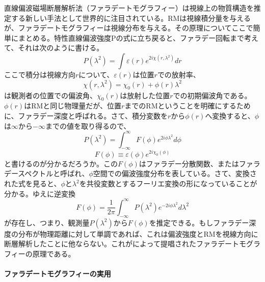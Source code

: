 直線偏波磁場断層解析法（ファラデートモグラフィー）は視線上の物質構造を推定する新しい手法として世界的に注目されている。RMは視線積分量を与えるが、ファラデートモグラフィーは視線分布を与える。その原理についてここで簡単にまとめる。特性直線偏波強度Pの式に立ち戻ると、ファラデー回転まで考えて、それは次のように書ける。
\begin{equation}
P(\lambda^2)=\int \varepsilon(r)e^{2i\chi(r,\lambda^2)}dr
\end{equation}
ここで積分は視線方向$r$について、$\varepsilon(r)$は位置$r$での放射率、
\begin{equation}
\chi(r,\lambda^2)=\chi_0(r)+\phi(r)\lambda^2
\end{equation}
は観測者の位置での偏波角、$\chi_0(r)$は放射した位置$r$での初期偏波角である。$\phi(r)$はRMと同じ物理量だが、位置$r$までのRMということを明確にするために、ファラデー深度と呼ばれる。さて、積分変数を$r$から$\phi(r)$へ変換すると、$\phi$は$\infty$から$-\infty$までの値を取り得るので、
\begin{equation}
P(\lambda^2)=\int^\infty_{-\infty}F(\phi)e^{2i\phi\lambda^2}d\phi
\end{equation}
\begin{equation}
F(\phi) \equiv \varepsilon(\phi)e^{2i\chi_0(\phi)}
\end{equation}
と書けるのが分かるだろうか。この$F(\phi)$はファラデー分散関数、またはファラデースペクトルと呼ばれ、$\phi$空間での偏波強度分布を表している。さて、変換された式を見ると、$\phi$と$\lambda^2$を共役変数とするフーリエ変換の形になっていることが分かる。ゆえに逆変換
\begin{equation}
F(\phi)=\frac{1}{2\pi}\int^\infty_{-\infty}P(\lambda^2)e^{-2i\phi\lambda^2}d\lambda^2
\end{equation}
が存在し、つまり、観測量$P(\lambda^2)$から$F(\phi)$を推定できる。もしファラデー深度の分布が物理距離に対して単調であれば、これは偏波強度とRMを視線方向に断層解析したことに他ならない。これが\citet{1966MNRAS.133...67B}によって提唱されたファラデートモグラフィーの原理である。

\paragraph{ファラデートモグラフィーの実用}

